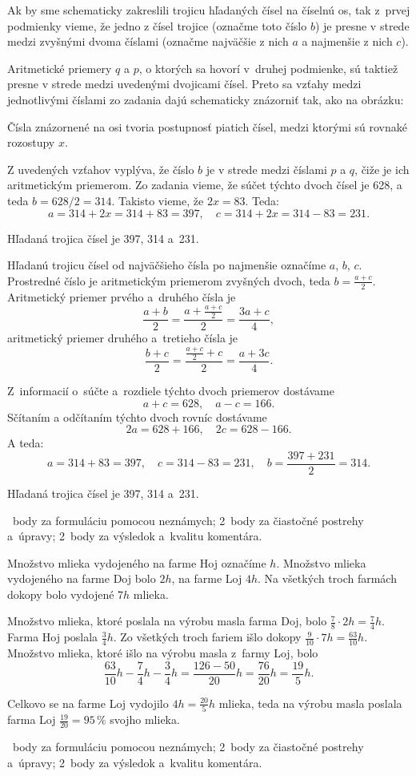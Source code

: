 {%
Ak by sme schematicky zakreslili trojicu hľadaných čísel na číselnú os, tak z~prvej podmienky vieme, že jedno z čísel trojice (označme toto číslo $b$) je presne v strede medzi zvyšnými dvoma číslami (označme najväčšie z nich $a$ a najmenšie z nich $c$).

Aritmetické priemery $q$ a $p$, o ktorých sa hovorí v~druhej podmienke, sú taktiež presne v strede medzi uvedenými dvojicami čísel. Preto sa vzťahy medzi jednotlivými číslami zo zadania dajú schematicky znázorniť tak, ako na obrázku:
%

Čísla znázornené na osi tvoria postupnosť piatich čísel, medzi ktorými sú rovnaké rozostupy $x$.

Z uvedených vzťahov vyplýva, že číslo $b$ je v strede medzi číslami $p$ a $q$, čiže je ich aritmetickým priemerom. Zo zadania vieme, že súčet týchto dvoch čísel je 628, a teda $b=628/2=314$.
Takisto vieme, že $2x=83$. Teda:
$$
a=314+2x=314+83=397,\quad c=314+2x=314-83=231.
$$

Hľadaná trojica čísel je 397, 314 a~231.

\ineriesenie
Hľadanú trojicu čísel od najväčšieho čísla po najmenšie označíme $a$, $b$, $c$.
Prostredné číslo je aritmetickým priemerom zvyšných dvoch, teda $b=\frac{a+c}2$.
Aritmetický priemer prvého a~druhého čísla je
$$
\frac{a+b}{2}
=\frac{a+\frac{a+c}{2}}{2}
=\frac{3a+c}{4},
$$
aritmetický priemer druhého a~tretieho čísla je
$$
\frac{b+c}{2}
=\frac{\frac{a+c}{2}+c}{2}
=\frac{a+3c}{4}.
$$

Z~informacií o~súčte a~rozdiele týchto dvoch priemerov dostávame
$$
a+c=628,\quad a-c=166.
$$
Sčítaním a odčítaním týchto dvoch rovníc dostávame
$$
2a=628+166,\quad 2c=628-166.
$$
A teda:
$$
a=314+83=397,\quad c=314-83=231,\quad
b=\frac{397+231}{2}=314.
$$

Hľadaná trojica čísel je 397, 314 a~231.

~body za formuláciu pomocou neznámych;
2~body za čiastočné postrehy a~úpravy;
2~body za výsledok a~kvalitu komentára.
\endhodnotenie
}

{%
Množstvo mlieka vydojeného na farme Hoj označíme $h$.
Množstvo mlieka vydojeného na farme Doj bolo $2h$, na farme Loj $4h$. Na všetkých troch farmách dokopy bolo vydojené $7h$ mlieka.

Množstvo mlieka, ktoré poslala na výrobu masla farma Doj, bolo $\frac78\cdot2h=\frac74h$. Farma Hoj poslala $\frac34h$. Zo všetkých troch fariem išlo dokopy $\frac9{10}\cdot7h= \frac{63}{10}h$.
Množstvo mlieka, ktoré išlo na výrobu masla z~farmy Loj, bolo
$$
\frac{63}{10}h-\frac74h-\frac34h =\frac{126-50}{20}h =\frac{76}{20}h =\frac{19}{5}h.
$$

Celkovo se na farme Loj vydojilo $4h=\frac{20}{5}h$ mlieka, teda na výrobu masla poslala farma Loj $\frac{19}{20}=95\,\%$ svojho mlieka.

~body za formuláciu pomocou neznámych;
2~body za čiastočné postrehy a~úpravy;
2~body za výsledok a~kvalitu komentára.
\endhodnotenie
}

